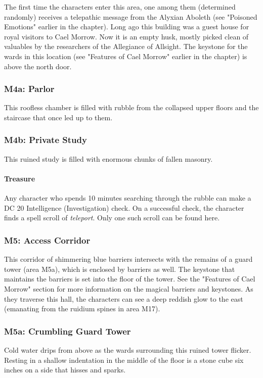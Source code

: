\documentclass[10pt,a4,twoside,twocolumn,openany,nodeprecatedcode]{dndbook}
\begin{document}
The first time the characters enter this area, one among them (determined randomly) receives a telepathic message from the Alyxian Aboleth (see "Poisoned Emotions" earlier in the chapter).
Long ago this building was a guest house for royal visitors to Cael Morrow. Now it is an empty husk, mostly picked clean of valuables by the researchers of the Allegiance of Allsight. The keystone for the wards in this location (see "Features of Cael Morrow" earlier in the chapter) is above the north door.
\subsubsection{M4a: Parlor}
This roofless chamber is filled with rubble from the collapsed upper floors and the staircase that once led up to them.
\subsubsection{M4b: Private Study}
This ruined study is filled with enormous chunks of fallen masonry.
\paragraph{Treasure}
Any character who spends 10 minutes searching through the rubble can make a DC 20 Intelligence (Investigation) check. On a successful check, the character finds a spell scroll of \textit{teleport}. Only one such scroll can be found here.
\subsubsection{M5: Access Corridor}
This corridor of shimmering blue barriers intersects with the remains of a guard tower (area M5a), which is enclosed by barriers as well. The keystone that maintains the barriers is set into the floor of the tower. See the "Features of Cael Morrow" section for more information on the magical barriers and keystones.
As they traverse this hall, the characters can see a deep reddish glow to the east (emanating from the ruidium spines in area M17).
\subsubsection{M5a: Crumbling Guard Tower}
\begin{DndReadAloud}{}
Cold water drips from above as the wards surrounding this ruined tower flicker. Resting in a shallow indentation in the middle of the floor is a stone cube six inches on a side that hisses and sparks.
\end{DndReadAloud}
\end{document}
